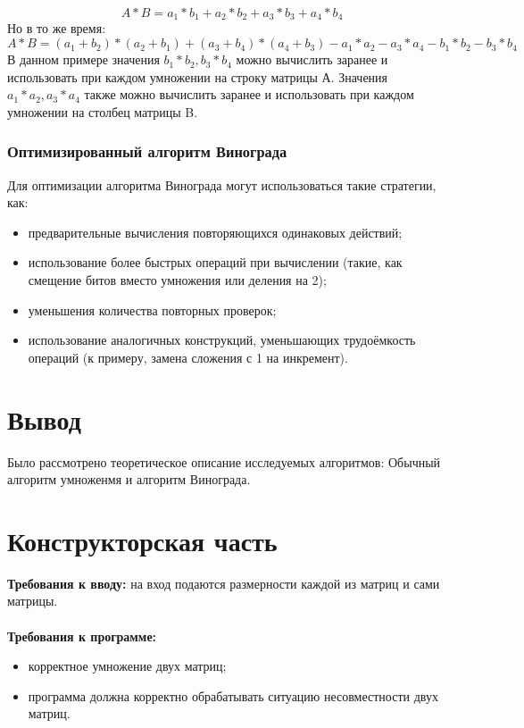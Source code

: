 \documentclass[12pt,a4paper]{article}
\numberwithin{equation}{section}
\begin{document}
\begin{equation}
	A * B = a_{1} * b_{1} + a_{2} * b_{2} + a_{3} * b_{3} + a_{4} * b_{4}
\end{equation}
Но в то же время:\\
\begin{equation}
	A * B = (a_{1} + b_{2}) * (a_{2} + b_{1}) + (a_{3} + b_{4}) * (a_{4} + b_{3}) - a_{1}*a_{2} - a_{3}*a_{4} - b_{1}*b_{2} - b_{3}*b_{4}
\end{equation}
\qquad В данном примере значения  $b_{1}*b_{2}, b_{3}*b_{4}$ можно вычислить заранее и использовать при каждом умножении на строку матрицы А. Значения $a_{1}*a_{2}, a_{3}*a_{4}$ также можно вычислить заранее и использовать при каждом умножении на столбец матрицы B.
\subsubsection{Оптимизированный алгоритм Винограда}
Для оптимизации алгоритма Винограда могут использоваться такие стратегии, как:
\begin{itemize}
	\item предварительные вычисления повторяющихся одинаковых действий;
	\item использование более быстрых операций при вычислении (такие, как смещение битов вместо умножения или деления на 2);
	\item уменьшения количества повторных проверок;
	\item использование аналогичных конструкций, уменьшающих трудоёмкость операций (к примеру, замена сложения с 1 на инкремент).
\end{itemize}
\section*{Вывод}
\qquad Было рассмотрено теоретическое описание исследуемых алгоритмов: Обычный алгоритм умноженмя и алгоритм Винограда.
\clearpage

\section{Конструкторская часть}
\textbf{Требования к вводу:} на вход подаются размерности каждой из матриц и сами матрицы.\\\\
\textbf{Требования к программе:}\\
\begin{itemize}
\item корректное умножение двух матриц;
\item программа должна корректно обрабатывать ситуацию несовместности двух матриц.
\end{itemize}
\clearpage
\end{document}
